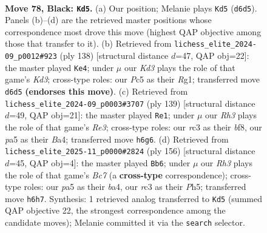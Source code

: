 \documentclass[11pt]{article}
\begin{document}
\clearpage

\begin{figure}[p]\centering
\begin{subfigure}{0.46\textwidth}\centering
\resizebox{\linewidth}{!}{%
\newchessgame
\chessboard[
  setfen={8/8/p2k3r/Ppp2p1p/2p2P1P/2R1PKP1/1P6/8 b - - 2 78},
  showmover=false,
  pgfstyle=straightmove, color=movearrow, markmove={d6-d5}
]}
\caption{}
\end{subfigure}\hfill
\begin{subfigure}{0.46\textwidth}\centering
\resizebox{\linewidth}{!}{%
\newchessgame
\chessboard[
  setfen={8/2pk2r1/1p1p2P1/p2P4/P1P5/1P1K4/8/6R1 w - - 0 70},
  showmover=false,
  pgfstyle=straightmove, color=movearrow, markmove={d3-e4}
]}
\caption{}
\end{subfigure}
\\[4pt]
\begin{subfigure}{0.46\textwidth}\centering
\resizebox{\linewidth}{!}{%
\newchessgame
\chessboard[
  setfen={5B2/6p1/4r1k1/1p1p1p1p/b2P1K1P/P1P2PP1/6R1/8 b - - 34 70},
  showmover=false,
  pgfstyle=straightmove, color=movearrow, markmove={e6-e1}
]}
\caption{}
\end{subfigure}\hfill
\begin{subfigure}{0.46\textwidth}\centering
\resizebox{\linewidth}{!}{%
\newchessgame
\chessboard[
  setfen={8/2B2kp1/p4p1p/1p1p3P/b2P2P1/P1P2PK1/8/8 w - - 37 79},
  showmover=false,
  pgfstyle=straightmove, color=movearrow, markmove={c7-b6}
]}
\caption{}
\end{subfigure}
\caption{\textbf{Move 78, Black: \texttt{Kd5}.} (a) Our position; Melanie plays \texttt{Kd5} (\texttt{d6d5}). Panels (b)--(d) are the retrieved master positions whose correspondence most drove this move (highest QAP objective among those that transfer to it). (b) Retrieved from \texttt{lichess\_elite\_2024-09\_p0012\#923} (ply 138) [structural distance $d$=47, QAP obj=22]: the master played \texttt{Ke4}; under $\mu$ our \emph{Kd3} plays the role of that game's \emph{Kd3}; cross-type roles: our \emph{P}c5 as their \emph{R}g1; transferred move \texttt{d6d5} \textbf{(endorses this move)}. (c) Retrieved from \texttt{lichess\_elite\_2024-09\_p0003\#3707} (ply 139) [structural distance $d$=49, QAP obj=21]: the master played \texttt{Re1}; under $\mu$ our \emph{Rh3} plays the role of that game's \emph{Re3}; cross-type roles: our \emph{r}c3 as their \emph{b}f8, our \emph{p}a5 as their \emph{B}a4; transferred move \texttt{h6g6}. (d) Retrieved from \texttt{lichess\_elite\_2025-11\_p0000\#2824} (ply 156) [structural distance $d$=45, QAP obj=4]: the master played \texttt{Bb6}; under $\mu$ our \emph{Rh3} plays the role of that game's \emph{Bc7} (a \textbf{cross-type} correspondence); cross-type roles: our \emph{p}a5 as their \emph{b}a4, our \emph{r}c3 as their \emph{P}h5; transferred move \texttt{h6h7}. Synthesis: 1 retrieved analog transferred to \texttt{Kd5} (summed QAP objective 22, the strongest correspondence among the candidate moves); Melanie committed it via the \texttt{search} selector.}
\label{fig:thought-m155}
\end{figure}
\end{document}
